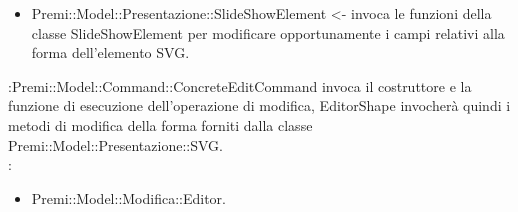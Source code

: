 {{{\begin{itemize}
                    \item Premi::Model::Presentazione::SlideShowElement <- invoca le funzioni della classe SlideShowElement per modificare opportunamente i campi relativi alla forma dell’elemento SVG.
				\end{itemize}	\textbf{\interfacce}:Premi::Model::Command::ConcreteEditCommand invoca il costruttore e la funzione di esecuzione dell’operazione di modifica, EditorShape invocherà quindi i metodi di modifica della forma forniti dalla classe Premi::Model::Presentazione::SVG.\\
                \textbf{\base}: 
                    \begin{itemize}
                    \item Premi::Model::Modifica::Editor.
                    \end{itemize}
                    }
}}
